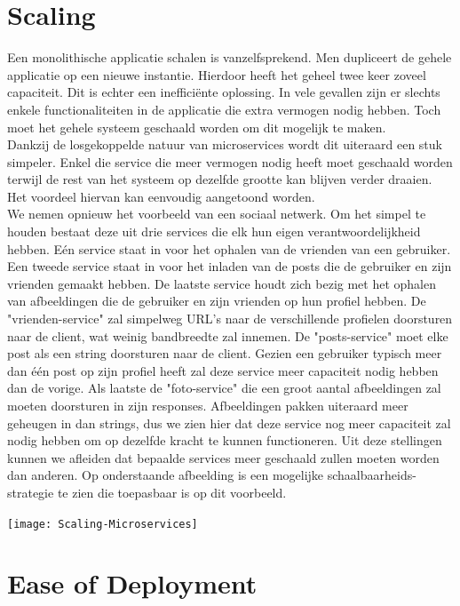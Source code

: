 \documentclass[pdftex,a4paper,12pt,twoside]{report}
\begin{document}
\section{Scaling}
\label{sec:scaling}

Een monolithische applicatie schalen is vanzelfsprekend. Men dupliceert de gehele applicatie op een nieuwe instantie. Hierdoor heeft het geheel twee keer zoveel capaciteit. Dit is echter een inefficiënte oplossing. In vele gevallen zijn er slechts enkele functionaliteiten in de applicatie die extra vermogen nodig hebben. Toch moet het gehele systeem geschaald worden om dit mogelijk te maken.
\\
Dankzij de losgekoppelde natuur van microservices wordt dit uiteraard een stuk simpeler. Enkel die service die meer vermogen nodig heeft moet geschaald worden terwijl de rest van het systeem op dezelfde grootte kan blijven verder draaien. Het voordeel hiervan kan eenvoudig aangetoond worden. 
\\
We nemen opnieuw het voorbeeld van een sociaal netwerk. Om het simpel te houden bestaat deze uit drie services die elk hun eigen verantwoordelijkheid hebben. Eén service staat in voor het ophalen van de vrienden van een gebruiker. Een tweede service staat in voor het inladen van de posts die de gebruiker en zijn vrienden gemaakt hebben. De laatste service houdt zich bezig met het ophalen van afbeeldingen die de gebruiker en zijn vrienden op hun profiel hebben. De "vrienden-service" zal simpelweg URL's naar de verschillende profielen doorsturen naar de client, wat weinig bandbreedte zal innemen. De "posts-service" moet elke post als een string doorsturen naar de client. Gezien een gebruiker typisch meer dan één post op zijn profiel heeft zal deze service meer capaciteit nodig hebben dan de vorige. Als laatste de "foto-service" die een groot aantal afbeeldingen zal moeten doorsturen in zijn responses. Afbeeldingen pakken uiteraard meer geheugen in dan strings, dus we zien hier dat deze service nog meer capaciteit zal nodig hebben om op dezelfde kracht te kunnen functioneren. Uit deze stellingen kunnen we afleiden dat bepaalde services meer geschaald zullen moeten worden dan anderen. Op onderstaande afbeelding is een mogelijke schaalbaarheids-strategie te zien die toepasbaar is op dit voorbeeld.
\\
\begin{center}
\texttt{[image: Scaling-Microservices]}
\end{center}

\section{Ease of Deployment}
\label{sec:ease-of-deployment}
\end{document}
